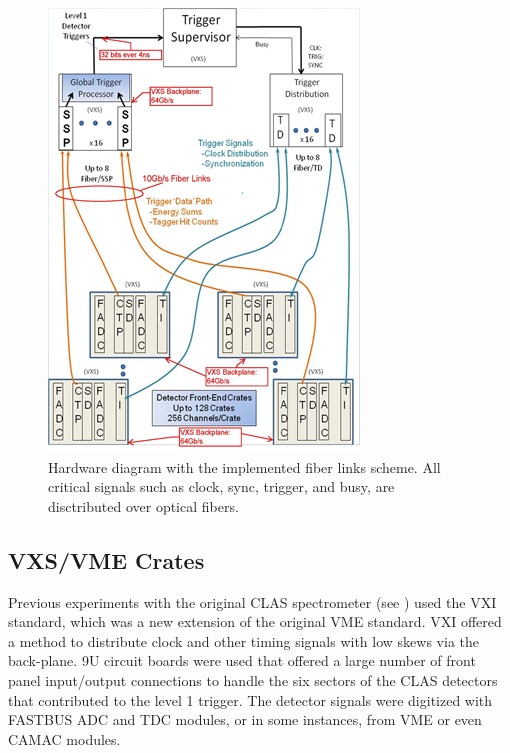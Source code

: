\begin{figure}[hbt]
	\centering
	\includegraphics[width=1.0\columnwidth,keepaspectratio]{img/hardware_diagram.png}
	\caption{Hardware diagram with the implemented fiber links scheme. All critical signals such as clock, sync, trigger, and busy, are disctributed over optical fibers.}
	\label{fig:hardwarediagram}
\end{figure}


\subsection{VXS/VME Crates}

Previous experiments with the original CLAS spectrometer (see \cite{clas-nim}) used the VXI standard, which was a new extension of the original VME standard. VXI offered a method to distribute clock and other timing signals with low skews via the back-plane. 9U circuit boards were used that offered a large number of front panel input/output connections to handle the six sectors of the CLAS detectors that contributed to the level 1 trigger. The detector signals were digitized with FASTBUS ADC and TDC modules, or in some instances, from VME or even CAMAC modules. 

